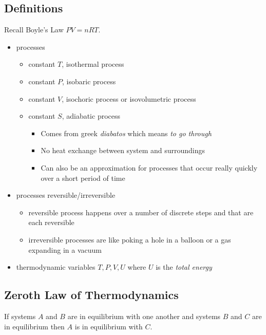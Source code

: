 \documentclass{article}
\begin{document}
\subsection{Definitions}

Recall Boyle's Law $PV = nRT$.

\begin{itemize}
        \item processes
        \begin{itemize}
                \item constant $T$, isothermal process
                \item constant $P$, isobaric process
                \item constant $V$, isochoric process or isovolumetric process
                \item constant $S$, adiabatic process
                \begin{itemize}
                        \item Comes from greek \textit{diabatos} which means \textit{to go through}
                        \item No heat exchange between system and surroundings
                        \item Can also be an approximation for processes that occur really quickly over a short period of time
                \end{itemize}
        \end{itemize}
        \item processes reversible/irreversible
        \begin{itemize}
                \item reversible process happens over a number of discrete steps and that are each reversible
                \item irreversible processes are like poking a hole in a balloon or a gas expanding in a vacuum
        \end{itemize}
        \item thermodynamic variables $T, P, V, U$ where $U$ is the \textit{total energy}
\end{itemize}

\subsection{Zeroth Law of Thermodynamics}

If systems $A$ and $B$ are in equilibrium with one another and systems $B$ and $C$ are in equilibrium then $A$ is in equilibrium with $C$.
\end{document}
